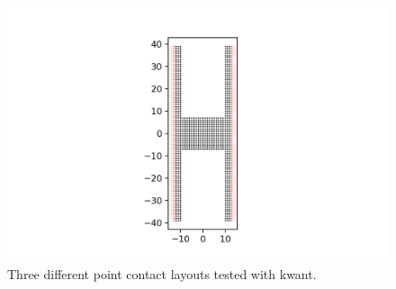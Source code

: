 \documentclass[12pt]{article}
\numberwithin{equation}{section}
\begin{document}
\begin{figure}
\begin{minipage}{0.333\textwidth}
    \includegraphics[width=1.6\textwidth]{./media/2degconst_W8_L10.png} %
  \end{minipage}
  \caption{Three different point contact layouts tested with kwant.}
\end{figure}
\end{document}
